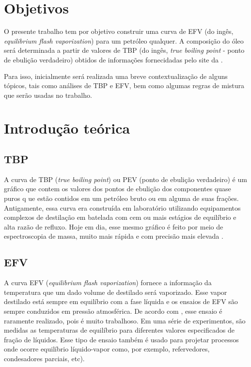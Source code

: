\section{Objetivos}
O presente trabalho tem por objetivo construir uma curva de EFV (do
ingês, \emph{equilibrium flash vaporization}) para um petróleo qualquer. A
composição do óleo será determinada a partir de valores de TBP (do ingês,
\emph{true boiling point} - ponto de ebulição verdadeiro) obtidos de
informações fornecidadas pelo site da \citeauthor{TOTSA2016}.

Para isso, inicialmente será realizada uma breve contextualização de alguns
tópicos, tais como análises de TBP e EFV, bem como algumas regras de mistura
que serão usadas no trabalho.

\section{Introdução teórica} 

\subsection{TBP}
A curva de TBP (\emph{true boiling point}) ou PEV (ponto de ebulição verdadeiro)
é um gráfico que contem os valores dos pontos de ebulição  dos componentes quase puros q
ue estão contidos em um petróleo bruto ou em alguma de suas frações. Antigamente, 
essa curva era construída em laboratório utilizando equipamentos complexos de 
destilação em batelada com cem ou mais estágios de equilíbrio e alta razão de 
refluxo. Hoje em dia, esse mesmo gráfico é feito por meio de espectroscopia de massa, 
muito mais rápida e com precisão mais elevada \cite{Jones2006}.

\subsection{EFV}


A curva EFV (\emph{equilibrium flash vaporization}) fornece a informação da
temperatura que um dado volume de destilado será vaporizado. Esse vapor
destilado está sempre em equilíbrio com a fase líquida e os ensaios de EFV são
sempre conduzidos em pressão atmosférica. De acordo com ,
esse ensaio é raramente realizado, pois é muito trabalhoso. Em uma série de
experimentos, são medidas as temperaturas de equilíbrio para diferentes valores especificados de 
 fração de líquidos. Esse tipo de ensaio também é usado para projetar processos
 onde ocorre equilíbrio líquido-vapor como, por exemplo, refervedores, condesadores
  parciais, etc).
  
